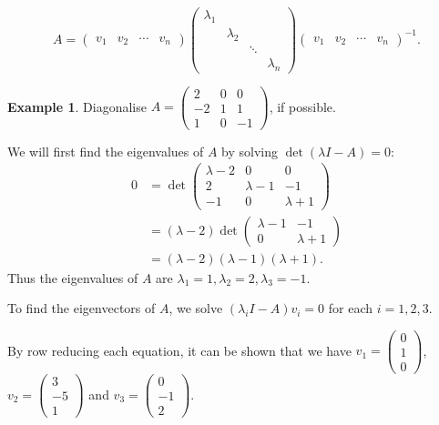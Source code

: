 \documentclass[a4paper]{article}
\theoremstyle{plain}
\theoremstyle{definition}
\newtheorem{example}[theorem]{Example}
\begin{document}
\[
	A=\begin{pmatrix}v_1 & v_2 & \cdots & v_n\end{pmatrix}
	\begin{pmatrix}
		\lambda_1 &           &        &           \\
		          & \lambda_2 &        &           \\
		          &           & \ddots &           \\
		          &           &        & \lambda_n
	\end{pmatrix}
	\begin{pmatrix}v_1 & v_2 & \cdots & v_n\end{pmatrix}^{-1}.
\]

\begin{example}
	Diagonalise $A=\begin{pmatrix}2&0&0\\-2&1&1\\1&0&-1\end{pmatrix}$, if possible.

	We will first find the eigenvalues of $A$ by solving $\det(\lambda I - A)=0$:
	\begin{align*}
		0 & =\det\begin{pmatrix}\lambda-2&0&0\\2&\lambda-1&-1\\-1&0&\lambda+1\end{pmatrix} \\
		  & =(\lambda-2)\det\begin{pmatrix}\lambda-1&-1\\0&\lambda+1\end{pmatrix}          \\
		  & =(\lambda-2)(\lambda-1)(\lambda+1).
	\end{align*}
	Thus the eigenvalues of $A$ are $\lambda_1=1,\lambda_2=2,\lambda_3=-1$.

	To find the eigenvectors of $A$, we solve $(\lambda_i I - A)v_i=0$ for each $i=1,2,3$.

	By row reducing each equation, it can be shown that we have $v_1=\begin{pmatrix}0\\1\\0\end{pmatrix}$,
	$v_2=\begin{pmatrix}3\\-5\\1\end{pmatrix}$ and $v_3=\begin{pmatrix}0\\-1\\2\end{pmatrix}$.


\end{example}
\end{document}
